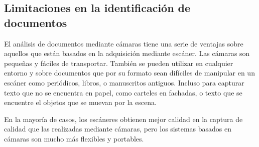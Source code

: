 \subsection{Limitaciones en la identificación de documentos}
El análisis de documentos mediante cámaras tiene una serie de ventajas sobre aquellos que están basados en la adquisición mediante escáner. Las cámaras son pequeñas y fáciles de transportar. También se pueden utilizar en cualquier entorno y sobre documentos que por su formato sean difíciles de manipular en un escáner como periódicos, libros, o manuscritos antiguos. Incluso para capturar texto que no se encuentra en papel, como carteles en fachadas, o texto que se encuentre el objetos que se muevan por la escena.

En la mayoría de casos, los escáneres obtienen mejor calidad en la captura de calidad que las realizadas mediante cámaras, pero los sistemas basados en cámaras son mucho más flexibles y portables. 

